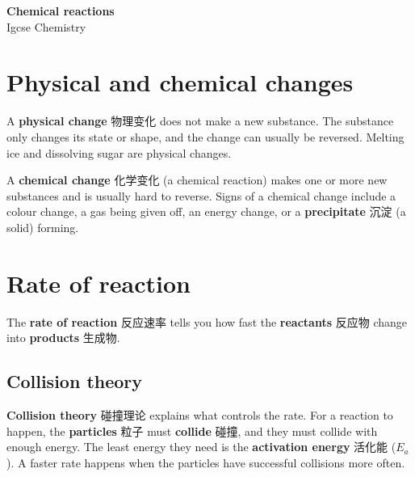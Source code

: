 \documentclass[11pt]{article}
\begin{document}
\begin{center}
  {\LARGE\bfseries Chemical reactions}\\[0.35em]
  {\large Igcse Chemistry}
\end{center}
\vspace{0.6em}

\section*{Physical and chemical changes}

A \textbf{physical change} 物理变化 does not make a new substance. The substance only changes its state or shape, and the change can usually be reversed. Melting ice and dissolving sugar are physical changes.

A \textbf{chemical change} 化学变化 (a chemical reaction) makes one or more new substances and is usually hard to reverse. Signs of a chemical change include a colour change, a gas being given off, an energy change, or a \textbf{precipitate} 沉淀 (a solid) forming.

\begin{center}
\end{center}

\section*{Rate of reaction}

The \textbf{rate of reaction} 反应速率 tells you how fast the \textbf{reactants} 反应物 change into \textbf{products} 生成物.

\subsection*{Collision theory}

\textbf{Collision theory} 碰撞理论 explains what controls the rate. For a reaction to happen, the \textbf{particles} 粒子 must \textbf{collide} 碰撞, and they must collide with enough energy. The least energy they need is the \textbf{activation energy} 活化能 ($E_a$). A faster rate happens when the particles have successful collisions more often.
\end{document}
